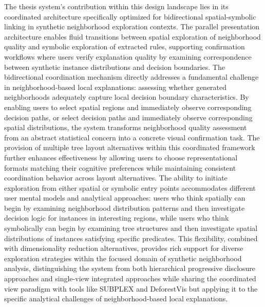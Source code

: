 The thesis system's contribution within this design landscape lies in its coordinated architecture specifically optimized for bidirectional spatial-symbolic linking in synthetic neighborhood exploration contexts. The parallel presentation architecture enables fluid transitions between spatial exploration of neighborhood quality and symbolic exploration of extracted rules, supporting confirmation workflows where users verify explanation quality by examining correspondence between synthetic instance distributions and decision boundaries. The bidirectional coordination mechanism directly addresses a fundamental challenge in neighborhood-based local explanations: assessing whether generated neighborhoods adequately capture local decision boundary characteristics. By enabling users to select spatial regions and immediately observe corresponding decision paths, or select decision paths and immediately observe corresponding spatial distributions, the system transforms neighborhood quality assessment from an abstract statistical concern into a concrete visual confirmation task. The provision of multiple tree layout alternatives within this coordinated framework further enhances effectiveness by allowing users to choose representational formats matching their cognitive preferences while maintaining consistent coordination behavior across layout alternatives. The ability to initiate exploration from either spatial or symbolic entry points accommodates different user mental models and analytical approaches: users who think spatially can begin by examining neighborhood distribution patterns and then investigate decision logic for instances in interesting regions, while users who think symbolically can begin by examining tree structures and then investigate spatial distributions of instances satisfying specific predicates. This flexibility, combined with dimensionality reduction alternatives, provides rich support for diverse exploration strategies within the focused domain of synthetic neighborhood analysis, distinguishing the system from both hierarchical progressive disclosure approaches and single-view integrated approaches while sharing the coordinated view paradigm with tools like SUBPLEX and DeforestVis but applying it to the specific analytical challenges of neighborhood-based local explanations.

